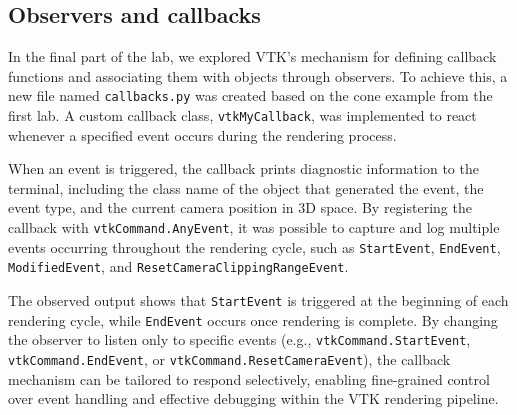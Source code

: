 \documentclass[10pt,conference]{IEEEtran}
\begin{document}
\subsection{Observers and callbacks}

In the final part of the lab, we explored VTK’s mechanism for defining callback functions and associating them with objects through observers. To achieve this, a new file named \texttt{callbacks.py} was created based on the cone example from the first lab. A custom callback class, \texttt{vtkMyCallback}, was implemented to react whenever a specified event occurs during the rendering process.

When an event is triggered, the callback prints diagnostic information to the terminal, including the class name of the object that generated the event, the event type, and the current camera position in 3D space. By registering the callback with \texttt{vtkCommand.AnyEvent}, it was possible to capture and log multiple events occurring throughout the rendering cycle, such as \texttt{StartEvent}, \texttt{EndEvent}, \texttt{ModifiedEvent}, and \texttt{ResetCameraClippingRangeEvent}.

The observed output shows that \texttt{StartEvent} is triggered at the beginning of each rendering cycle, while \texttt{EndEvent} occurs once rendering is complete. By changing the observer to listen only to specific events (e.g., \texttt{vtkCommand.StartEvent}, \texttt{vtkCommand.EndEvent}, or \texttt{vtkCommand.ResetCameraEvent}), the callback mechanism can be tailored to respond selectively, enabling fine-grained control over event handling and effective debugging within the VTK rendering pipeline.
\end{document}
